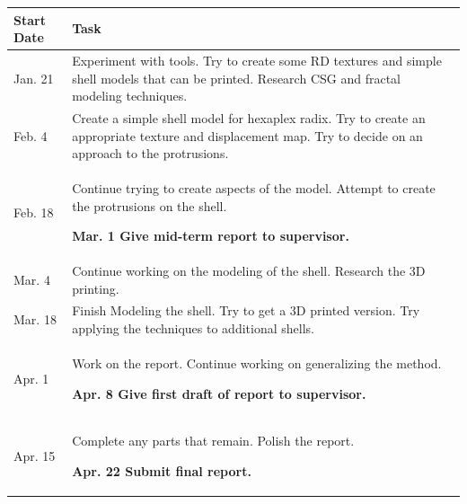 \begin{center}
	\begin{tabular}{ | l | p{130mm} | }
		\hline
		Start Date & Task \\ \hline
		Jan. 21 & Experiment with tools. Try to create some RD textures and simple shell models that can be printed. Research CSG and fractal modeling techniques. \\ \hline
		
		Feb. 4 & Create a simple shell model for hexaplex radix. Try to create an appropriate texture and displacement map. Try to decide on an approach to the protrusions. \\ \hline
		
		Feb. 18 & Continue trying to create aspects of the model. Attempt to create the protrusions on the shell. 
		
		\textbf{Mar. 1 Give mid-term report to supervisor.} \\ \hline
		
		Mar. 4 & Continue working on the modeling of the shell. Research the 3D printing. \\ \hline
		
		Mar. 18 & Finish Modeling the shell. Try to get a 3D printed version. Try applying the techniques to additional shells. \\ \hline
		
		Apr. 1 & Work on the report. Continue working on generalizing the method.
		
		 \textbf{Apr. 8 Give first draft of report to supervisor.}  \\ \hline
		
		Apr. 15 & Complete any parts that remain. Polish the report. 
		
		\textbf{Apr. 22  Submit final report.} \\ \hline
	\end{tabular}
\end{center}